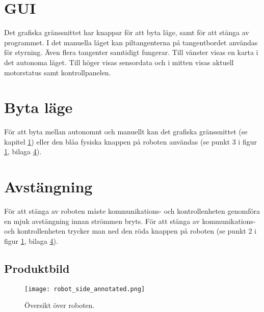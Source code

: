 \documentclass[a4paper,11pt]{article}
\begin{document}
\section{GUI}\label{sec:gui}
Det grafiska gränssnittet har knappar för att byta läge, samt för att stänga av programmet. I det manuella läget kan piltangenterna på tangentbordet användas för styrning. Även flera tangenter samtidigt fungerar. Till vänster visas en karta i det autonoma läget. Till höger visas sensordata och i mitten visas aktuell motorstatus samt kontrollpanelen.

\section{Byta läge}
För att byta mellan autonomnt och manuellt kan det grafiska gränssnittet (se kapitel \ref{sec:gui}) eller den blåa fysiska knappen på roboten användas (se punkt 3 i figur \ref{fig:robot_overview}, bilaga \ref{app:picture}).

\section{Avstängning}
För att stänga av roboten måste kommunikations- och kontrollenheten genomföra en mjuk avstängning innan strömmen bryts. För att stänga av kommunikations- och kontrollenheten trycker man ned den röda knappen på roboten (se punkt 2 i figur \ref{fig:robot_overview}, bilaga \ref{app:picture}).

\clearpage
\begin{appendices}
\section{Produktbild}\label{app:picture}
 \begin{figure}[h!]
     \centering
     \texttt{[image: robot\_side\_annotated.png]}
     \caption{Översikt över roboten.}
     \label{fig:robot_overview}
 \end{figure}
\end{appendices}
\end{document}
